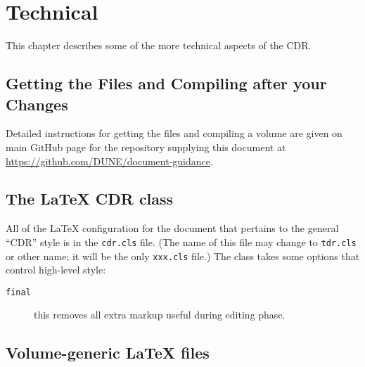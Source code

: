 \chapter{Technical}

This chapter describes some of the more technical aspects of the CDR.

\section{Getting the Files and Compiling after your Changes}
\label{sec:getfiles-compile}

Detailed instructions for getting the files and compiling a volume are
given on main GitHub page for the repository supplying this document at
\url{https://github.com/DUNE/document-guidance}.


\section{The \LaTeX{} CDR class}

All of the \LaTeX{} configuration for the document that pertains to
the general ``CDR'' style is in the
\texttt{cdr.cls} file. (The name of this file may change to \texttt{tdr.cls} or other name; it will be the only \texttt{xxx.cls} file.)
The class takes some options that control high-level style:

\begin{description}
\item[\texttt{final}] this removes all extra markup useful during
  editing phase.
\end{description}

\section{Volume-generic \LaTeX{} files}

